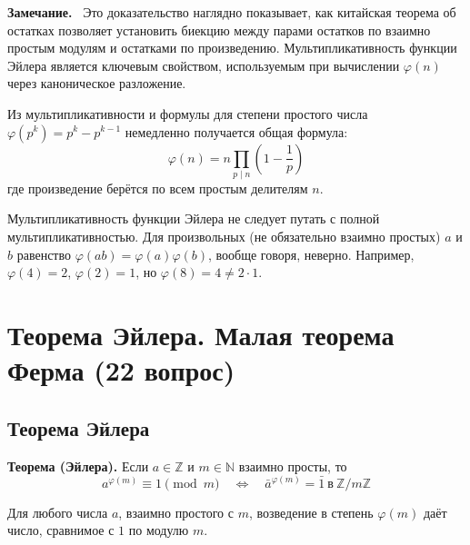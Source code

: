 \documentclass[a4paper,12pt]{article}
\newcommand{\myremark}{\textbf{Замечание.}\ }
\theoremstyle{definition}
\theoremstyle{plain}
\theoremstyle{remark}
\begin{document}
	\myremark
	Это доказательство наглядно показывает, как китайская теорема об остатках позволяет установить биекцию между парами остатков по взаимно простым модулям и остатками по произведению. Мультипликативность функции Эйлера является ключевым свойством, используемым при вычислении $\varphi(n)$ через каноническое разложение.
	
	\begin{tcolorbox}[colback=purple!5, colframe=purple!50!black, title=Заметочка]
		Из мультипликативности и формулы для степени простого числа $\varphi(p^k) = p^k - p^{k-1}$ немедленно получается общая формула:
		\[
		\varphi(n) = n \prod_{p \mid n} \left(1 - \frac{1}{p}\right)
		\]
		где произведение берётся по всем простым делителям $n$.
	\end{tcolorbox}
	
	\begin{tcolorbox}[colback=yellow!5, colframe=orange!60!black, title=Важное замечание]
		Мультипликативность функции Эйлера не следует путать с полной мультипликативностью. Для произвольных (не обязательно взаимно простых) $a$ и $b$ равенство $\varphi(ab) = \varphi(a)\varphi(b)$, вообще говоря, неверно. Например, $\varphi(4) = 2$, $\varphi(2) = 1$, но $\varphi(8) = 4 \neq 2 \cdot 1$.
	\end{tcolorbox}
	
	
	
	
	
	
	\newpage
	\section{Теорема Эйлера. Малая теорема Ферма (22 вопрос)}
	
	\subsection{Теорема Эйлера}
	
	\noindent \textbf{Теорема (Эйлера).}
	Если $a \in \mathbb{Z}$ и $m \in \mathbb{N}$ взаимно просты, то
	\[
	a^{\varphi(m)} \equiv 1 \pmod{m} \quad \Longleftrightarrow \quad \bar{a}^{\varphi(m)} = \bar{1} \ \text{в} \ \mathbb{Z}/m\mathbb{Z}
	\]
	
	\begin{tcolorbox}[colback=red!5, colframe=red!70!black, title=Формулировка]
		Для любого числа $a$, взаимно простого с $m$, возведение в степень $\varphi(m)$ даёт число, сравнимое с $1$ по модулю $m$.
	\end{tcolorbox}
	
\end{document}
